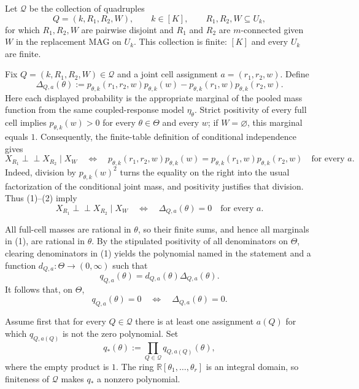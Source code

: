 Let \(\mathcal Q\) be the collection of quadruples
\[
 Q=(k,R_1,R_2,W),
 \qquad k\in[K],
 \qquad R_1,R_2,W\subseteq U_k,
\]
for which \(R_1,R_2,W\) are pairwise disjoint and \(R_1\) and \(R_2\) are \(m\)-connected given \(W\) in the replacement MAG on \(U_k\).  This collection is finite: \([K]\) and every \(U_k\) are finite.

Fix \(Q=(k,R_1,R_2,W)\in\mathcal Q\) and a joint cell assignment \(a=(r_1,r_2,w)\).  Define
\[
 \Delta_{Q,a}(\theta)
 :=p_{\theta,k}(r_1,r_2,w)p_{\theta,k}(w)
   -p_{\theta,k}(r_1,w)p_{\theta,k}(r_2,w).
 \tag{1}
\]
Here each displayed probability is the appropriate marginal of the pooled mass function from the same coupled-response model \(\eta_\theta\).  Strict positivity of every full cell implies \(p_{\theta,k}(w)>0\) for every \(\theta\in\Theta\) and every \(w\); if \(W=\varnothing\), this marginal equals \(1\).  Consequently, the finite-table definition of conditional independence gives
\[
 X_{R_1}\mathbin{\perp\!\!\!\perp}X_{R_2}\mid X_W
 \quad\Longleftrightarrow\quad
 p_{\theta,k}(r_1,r_2,w)p_{\theta,k}(w)
 =p_{\theta,k}(r_1,w)p_{\theta,k}(r_2,w)
 \quad\text{for every }a.
 \tag{2}
\]
Indeed, division by \(p_{\theta,k}(w)^2\) turns the equality on the right into the usual factorization of the conditional joint mass, and positivity justifies that division.  Thus (1)--(2) imply
\[
 X_{R_1}\mathbin{\perp\!\!\!\perp}X_{R_2}\mid X_W
 \quad\Longleftrightarrow\quad
 \Delta_{Q,a}(\theta)=0\quad\text{for every }a.
 \tag{3}
\]

All full-cell masses are rational in \(\theta\), so their finite sums, and hence all marginals in (1), are rational in \(\theta\).  By the stipulated positivity of all denominators on \(\Theta\), clearing denominators in (1) yields the polynomial named in the statement and a function \(d_{Q,a}:\Theta\to(0,\infty)\) such that
\[
 q_{Q,a}(\theta)=d_{Q,a}(\theta)\Delta_{Q,a}(\theta).
 \tag{4}
\]
It follows that, on \(\Theta\),
\[
 q_{Q,a}(\theta)=0
 \quad\Longleftrightarrow\quad
 \Delta_{Q,a}(\theta)=0.
 \tag{5}
\]

Assume first that for every \(Q\in\mathcal Q\) there is at least one assignment \(a(Q)\) for which \(q_{Q,a(Q)}\) is not the zero polynomial.  Set
\[
 q_*(\theta):=\prod_{Q\in\mathcal Q}q_{Q,a(Q)}(\theta),
 \tag{6}
\]
where the empty product is \(1\).  The ring \(\mathbb R[\theta_1,\ldots,\theta_r]\) is an integral domain, so finiteness of \(\mathcal Q\) makes \(q_*\) a nonzero polynomial.

